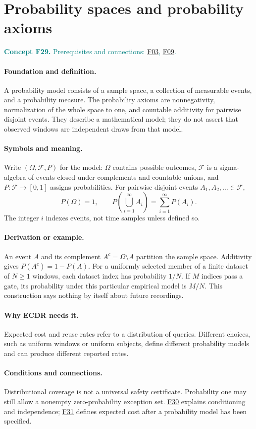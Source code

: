 \documentclass[11pt,a4paper]{article}
\newcommand{\conceptid}{Front matter}
\newcommand{\concept}[3]{\clearpage\renewcommand{\conceptid}{#1}%
\section{#2}\label{concept:#1}%
\textcolor{teal}{\textbf{Concept #1.} Prerequisites and connections: #3.}\par
\typeout{ECDR-CONCEPT-START #1 PAGE=\thepage}}
\begin{document}
\concept{F29}{Probability spaces and probability axioms}{\hyperref[concept:F03]{F03}, \hyperref[concept:F09]{F09}}
\paragraph{Foundation and definition.}
A probability model consists of a sample space, a collection of
measurable events, and a probability measure. The probability axioms
are nonnegativity, normalization of the whole space to one, and
countable additivity for pairwise disjoint events. They describe a
mathematical model; they do not assert that observed windows are
independent draws from that model.
\paragraph{Symbols and meaning.}
Write $(\Omega,\mathcal F,P)$ for the model: $\Omega$ contains
possible outcomes, $\mathcal F$ is a sigma-algebra of events closed
under complements and countable unions, and $P:\mathcal F\to[0,1]$
assigns probabilities. For pairwise disjoint events
$A_1,A_2,\ldots\in\mathcal F$,
\[
 P(\Omega)=1,\qquad
 P\!\left(\bigcup_{i=1}^{\infty}A_i\right)
 =\sum_{i=1}^{\infty}P(A_i).
\]
The integer $i$ indexes events, not time samples unless defined so.
\paragraph{Derivation or example.}
An event $A$ and its complement $A^c=\Omega\setminus A$ partition
the sample space. Additivity gives $P(A^c)=1-P(A)$.
For a uniformly selected member of a finite dataset of $N\ge1$
windows, each dataset index has probability $1/N$. If $M$ indices pass
a gate, its probability under this particular empirical model is $M/N$.
This construction says nothing by itself about future recordings.
\paragraph{Why ECDR needs it.}
Expected cost and reuse rates refer to a distribution of queries.
Different choices, such as uniform windows or uniform subjects, define
different probability models and can produce different reported rates.
\paragraph{Conditions and connections.}
Distributional coverage is not a universal safety certificate.
Probability one may still allow a nonempty zero-probability exception
set. \hyperref[concept:F30]{F30} explains conditioning and independence; \hyperref[concept:F31]{F31} defines expected
cost after a probability model has been specified.
\par\label{endconcept:F29}
\end{document}
